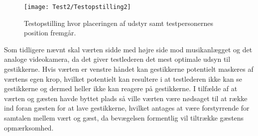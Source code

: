 %
\begin{figure}[H]
	\centering
	\texttt{[image: Test2/Testopstilling2]}
	\caption{Testopstilling hvor placeringen af udstyr samt testpersonernes position fremgår.}
	\label{fig:Testopstilling2}
\end{figure}
\noindent
% 
Som tidligere nævnt skal værten sidde med højre side mod musikanlægget og det analoge videokamera, da det giver testlederen det mest optimale udsyn til gestikkerne. Hvis værten er venstre håndet kan gestikkerne potentielt maskeres af værtens egen krop, hvilket potentielt kan resultere i at testlederen ikke kan se gestikkerne og dermed heller ikke kan reagere på gestikkerne. I tilfælde af at værten og gæsten havde byttet plads så ville værten være nødsaget til at række ind foran gæsten for at lave gestikkerne, hvilket antages at være forstyrrende for samtalen mellem vært og gæst, da bevægelsen formentlig vil tiltrække gæstens opmærksomhed. 

